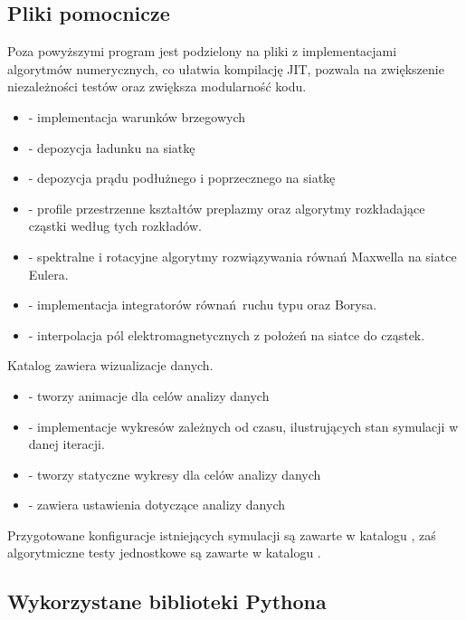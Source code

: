 \subsection{Pliki pomocnicze}
Poza powyższymi program jest podzielony na pliki z implementacjami algorytmów numerycznych,
co ułatwia kompilację JIT, pozwala na zwiększenie niezależności testów oraz
zwiększa modularność kodu.
\begin{itemize}
    \item {} - implementacja warunków brzegowych
    \item {} - depozycja ładunku na siatkę
    \item {} - depozycja prądu podłużnego i poprzecznego na siatkę
    \item {} - profile przestrzenne kształtów preplazmy
        oraz algorytmy rozkładające cząstki według tych rozkładów.
    \item {} - spektralne i rotacyjne algorytmy rozwiązywania równań Maxwella na siatce Eulera.
    \item {} - implementacja integratorów równań ruchu typu  oraz Borysa.
    \item {} - interpolacja pól elektromagnetycznych z położeń na siatce do cząstek.
\end{itemize}

Katalog  zawiera wizualizacje danych.
\begin{itemize}
    \item {} - tworzy animacje dla celów analizy danych
    \item {} - implementacje wykresów zależnych od czasu, ilustrujących stan symulacji w danej iteracji.
    \item {} - tworzy statyczne wykresy dla celów analizy danych
    \item {} - zawiera ustawienia dotyczące analizy danych
\end{itemize}

Przygotowane konfiguracje istniejących symulacji są zawarte w katalogu 
, zaś algorytmiczne testy jednostkowe są zawarte w katalogu .

\subsection{Wykorzystane biblioteki Pythona}

